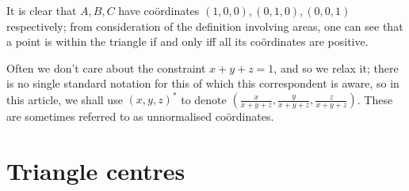 \begin{multicols}{2}
It is clear that \(A,B,C\) have co\"ordinates \((1,0,0),(0,1,0),(0,0,1)\) respectively; from consideration of the definition involving areas, one can see that a point is within the triangle if and only iff all its co\"ordinates are positive.

Often we don't care about the constraint \(x+y+z=1\), and so we relax it; there is no single standard notation for this of which this correspondent is aware, so in this article, we shall use \((x,y,z)^*\) to denote \((\frac{x}{x+y+z},\frac{y}{x+y+z},\frac{z}{x+y+z})\). These are sometimes referred to as unnormalised co\"ordinates.

\end{multicols}
\section{Triangle centres}
